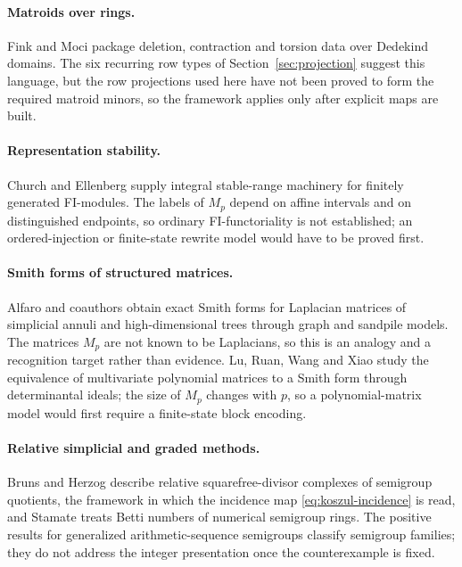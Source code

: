 \documentclass[11pt]{article}
\theoremstyle{definition}
\theoremstyle{remark}
\begin{document}
\paragraph{Matroids over rings.} Fink and Moci \cite{FinkMoci} package deletion,
contraction and torsion data over Dedekind domains. The six recurring row types
of Section~\ref{sec:projection} suggest this language, but the row projections
used here have not been proved to form the required matroid minors, so the
framework applies only after explicit maps are built.

\paragraph{Representation stability.} Church and Ellenberg \cite{ChurchEllenberg}
supply integral stable-range machinery for finitely generated FI-modules. The
labels of $M_p$ depend on affine intervals and on distinguished endpoints, so
ordinary FI-functoriality is not established; an ordered-injection or
finite-state rewrite model would have to be proved first.

\paragraph{Smith forms of structured matrices.} Alfaro and coauthors
\cite{Alfaro} obtain exact Smith forms for Laplacian matrices of simplicial
annuli and high-dimensional trees through graph and sandpile models. The matrices
$M_p$ are not known to be Laplacians, so this is an analogy and a recognition
target rather than evidence. Lu, Ruan, Wang and Xiao \cite{LuRuan} study the
equivalence of multivariate polynomial matrices to a Smith form through
determinantal ideals; the size of $M_p$ changes with $p$, so a polynomial-matrix
model would first require a finite-state block encoding.

\paragraph{Relative simplicial and graded methods.} Bruns and Herzog
\cite{BrunsHerzog} describe relative squarefree-divisor complexes of semigroup
quotients, the framework in which the incidence map
\eqref{eq:koszul-incidence} is read, and Stamate \cite{Stamate} treats Betti
numbers of numerical semigroup rings. The positive results for generalized arithmetic-sequence
semigroups \cite{Landeros} classify semigroup families; they do not address the
integer presentation once the counterexample is fixed.
\end{document}
